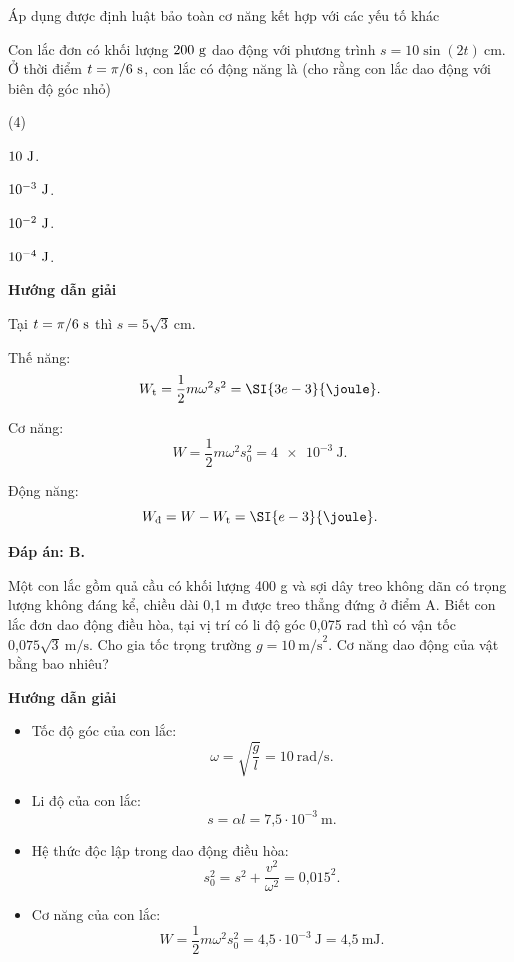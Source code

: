 \begin{dang}{Áp dụng được định luật bảo toàn cơ năng kết hợp với các yếu tố khác}
	{
		Con lắc đơn có khối lượng $200\ \text g$ dao động với phương trình $s=10\sin(2t)\ \text{cm}$. Ở thời điểm $t=\pi /6\ \text s$, con lắc có động năng là (cho rằng con lắc dao động với biên độ góc nhỏ)
		\begin{mcq}(4)
			\item $10\ \text J$.
			\item $10^{-3}\ \text J$.
			\item $10^{-2}\ \text J$.
			\item $10^{-4}\ \text J$.
		\end{mcq}
	}
	{\begin{center}
			\textbf{Hướng dẫn giải}
		\end{center}
		
		Tại $t=\pi/6\ \text s$ thì $s=5\sqrt{3}\ \text{cm}$.
		
		Thế năng:
		$$W_\text t = \dfrac{1}{2}m\omega^2s^2 = \SI{3e-3}{\joule}.$$
		
		Cơ năng:
		$$W=\dfrac{1}{2}m\omega^2s_0^2 = \SI{4e-3}{\joule}.$$
		
		Động năng:
		$$W_\text{đ}=W-W_\text t = \SI{e-3}{\joule}.$$
		
		\textbf{Đáp án: B.}
	}
	{
		Một con lắc gồm quả cầu có khối lượng 400 g và sợi dây treo không dãn có trọng lượng không đáng kể, chiều dài 0,1 m được treo thẳng đứng ở điểm A. Biết con lắc đơn dao động điều hòa, tại vị trí có li độ góc 0,075 rad thì có vận tốc $\text{0,075}\sqrt {3}\ \text{m/s}$. Cho gia tốc trọng trường $g=10\ \text{m/s}^2$. Cơ năng dao động của vật bằng bao nhiêu?
	}
	{\begin{center}
			\textbf{Hướng dẫn giải}
		\end{center}
		
		\begin{itemize}
			\item Tốc độ góc của con lắc:
			\begin{equation*}
				\omega= \sqrt{\dfrac{g}{l}} =10\ \text{rad/s}.
			\end{equation*}
			\item Li độ của con lắc:
			\begin{equation*}
				s=\alpha l  = \text{7,5} \cdot 10^{-3}\ \text{m}.
			\end{equation*}
			\item Hệ thức độc lập trong dao động điều hòa: 
			\begin{equation*}
				s^2_0 = s^2 +\dfrac{v^2}{\omega^2} = \text{0,015}^2.
			\end{equation*}
			\item Cơ năng của con lắc:
			\begin{equation*}
				W=\dfrac{1}{2}m\omega^2 s^2_0 = \text{4,5} \cdot 10^{-3}\ \text{J} = \text{4,5}\ \text{mJ}.
			\end{equation*}
		\end{itemize}
	}
\end{dang}